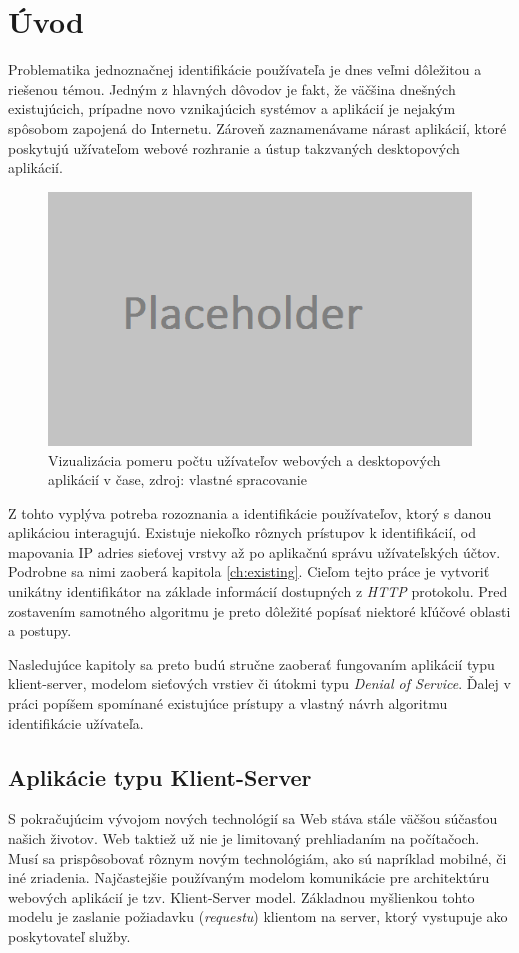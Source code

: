 \documentclass[
  printed, %
  table,   %
  lof,     %
  lot,     %
]{fithesis3}
\begin{document}
\chapter{Úvod}
Problematika jednoznačnej identifikácie používateľa je dnes veľmi
dôležitou a riešenou témou. Jedným z hlavných dôvodov je fakt, že väčšina
dnešných existujúcich, prípadne novo vznikajúcich systémov a aplikácií je
nejakým spôsobom zapojená do Internetu. Zároveň zaznamenávame nárast
aplikácií, ktoré poskytujú užívateľom webové rozhranie a ústup takzvaných
desktopových aplikácií.

\begin{figure}[h]
  \centering
    \includegraphics[width=.80\textwidth]{images/web-vs-desktop.png}
  \caption{Vizualizácia pomeru počtu užívateľov webových a desktopových
  aplikácií v čase, zdroj: vlastné spracovanie}
  \label{fig:web-vs-desktop}
\end{figure}

	Z tohto vyplýva potreba rozoznania a identifikácie používateľov, ktorý s
danou aplikáciou interagujú. Existuje niekoľko rôznych prístupov k 
identifikácií, od mapovania IP adries sieťovej vrstvy až po aplikačnú správu
užívateľských účtov. Podrobne sa nimi zaoberá kapitola \ref{ch:existing}.
Cieľom tejto práce je vytvoriť unikátny identifikátor na základe informácií
dostupných z \textit{HTTP} protokolu. Pred zostavením samotného algoritmu je
preto dôležité popísať niektoré kľúčové oblasti a postupy.

Nasledujúce kapitoly sa preto budú stručne zaoberať fungovaním aplikácií typu
klient-server, modelom sieťových vrstiev či útokmi typu \textit{Denial of
Service}. Ďalej v práci popíšem spomínané existujúce prístupy a vlastný návrh
algoritmu identifikácie užívateľa. 

\section{Aplikácie typu Klient-Server}
	S pokračujúcim vývojom nových technológií sa Web stáva stále väčšou
súčasťou našich životov. Web taktiež už nie je limitovaný prehliadaním na
počítačoch. Musí sa prispôsobovať rôznym novým technológiám, ako sú napríklad
mobilné, či iné zriadenia. Najčastejšie používaným modelom komunikácie pre
architektúru webových aplikácií je tzv. Klient-Server model. Základnou
myšlienkou tohto modelu je zaslanie požiadavku (\textit{requestu}) klientom na
server, ktorý vystupuje ako poskytovateľ služby.
\end{document}
